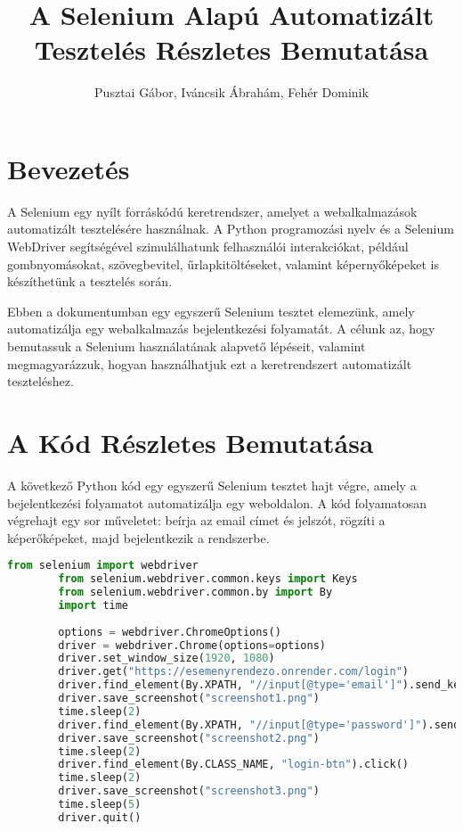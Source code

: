 \documentclass[12pt]{article}
\title{A Selenium Alapú Automatizált Tesztelés Részletes Bemutatása}
\author{Pusztai Gábor, Iváncsik Ábrahám, Fehér Dominik}
\begin{document}
	
	\maketitle
	
	\section{Bevezetés}
	
	A Selenium egy nyílt forráskódú keretrendszer, amelyet a webalkalmazások automatizált tesztelésére használnak. A Python programozási nyelv és a Selenium WebDriver segítségével szimulálhatunk felhasználói interakciókat, például gombnyomásokat, szövegbevitel, űrlapkitöltéseket, valamint képernyőképeket is készíthetünk a tesztelés során.
	
	Ebben a dokumentumban egy egyszerű Selenium tesztet elemezünk, amely automatizálja egy webalkalmazás bejelentkezési folyamatát. A célunk az, hogy bemutassuk a Selenium használatának alapvető lépéseit, valamint megmagyarázzuk, hogyan használhatjuk ezt a keretrendszert automatizált teszteléshez.
	
	\section{A Kód Részletes Bemutatása}
	
	A következő Python kód egy egyszerű Selenium tesztet hajt végre, amely a bejelentkezési folyamatot automatizálja egy weboldalon. A kód folyamatosan végrehajt egy sor műveletet: beírja az email címet és jelszót, rögzíti a képerőképeket, majd bejelentkezik a rendszerbe.
	
	\begin{lstlisting}[language=Python, caption=Az Automatizált Tesztelési Kód]
		from selenium import webdriver
		from selenium.webdriver.common.keys import Keys
		from selenium.webdriver.common.by import By
		import time
		
		options = webdriver.ChromeOptions()
		driver = webdriver.Chrome(options=options)
		driver.set_window_size(1920, 1080)
		driver.get("https://esemenyrendezo.onrender.com/login")
		driver.find_element(By.XPATH, "//input[@type='email']").send_keys('TothB')
		driver.save_screenshot("screenshot1.png")
		time.sleep(2)
		driver.find_element(By.XPATH, "//input[@type='password']").send_keys('a')
		driver.save_screenshot("screenshot2.png")
		time.sleep(2)
		driver.find_element(By.CLASS_NAME, "login-btn").click()
		time.sleep(2)
		driver.save_screenshot("screenshot3.png")
		time.sleep(5)
		driver.quit()
	\end{lstlisting}
	
\end{document}

